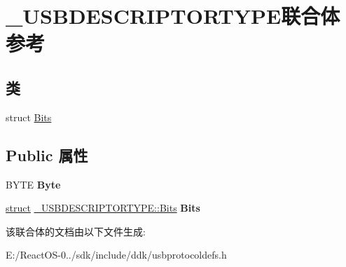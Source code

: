 \hypertarget{union___u_s_b_d_e_s_c_r_i_p_t_o_r_t_y_p_e}{}\section{\+\_\+\+U\+S\+B\+D\+E\+S\+C\+R\+I\+P\+T\+O\+R\+T\+Y\+P\+E联合体 参考}
\label{union___u_s_b_d_e_s_c_r_i_p_t_o_r_t_y_p_e}
\subsection*{类}
\begin{DoxyCompactItemize}
\item 
struct \hyperlink{struct___u_s_b_d_e_s_c_r_i_p_t_o_r_t_y_p_e_1_1_bits}{Bits}
\end{DoxyCompactItemize}
\subsection*{Public 属性}
\begin{DoxyCompactItemize}
\item 
\mbox{\label{union___u_s_b_d_e_s_c_r_i_p_t_o_r_t_y_p_e_a8ee20c6d6856dc6a7e78d0196a740ed9}} 
B\+Y\+TE {\bfseries Byte}
\item 
\mbox{\label{union___u_s_b_d_e_s_c_r_i_p_t_o_r_t_y_p_e_a7f61fafad5e87f393cb470b6a0ce3d6c}} 
\hyperlink{interfacestruct}{struct} \hyperlink{struct___u_s_b_d_e_s_c_r_i_p_t_o_r_t_y_p_e_1_1_bits}{\+\_\+\+U\+S\+B\+D\+E\+S\+C\+R\+I\+P\+T\+O\+R\+T\+Y\+P\+E\+::\+Bits} {\bfseries Bits}
\end{DoxyCompactItemize}


该联合体的文档由以下文件生成\+:\begin{DoxyCompactItemize}
\item 
E\+:/\+React\+O\+S-\/0../sdk/include/ddk/usbprotocoldefs.\+h\end{DoxyCompactItemize}
